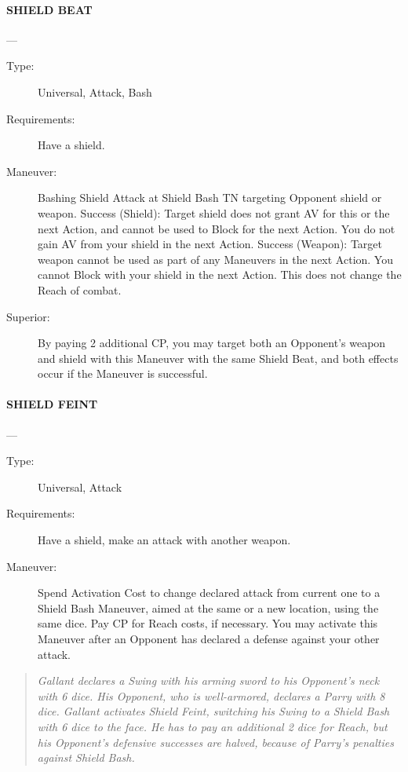 \documentclass[oneside,11pt,english]{book}
\begin{document}
\paragraph{\large\label{man:SHIELD BEAT} SHIELD BEAT}---\quad{\large[X+2]}
\vspace{-10pt}\begin{description} 
\item [Type:] Universal, Attack, Bash 
\item [Requirements:] Have a shield. 
\item [Maneuver:] Bashing Shield Attack at Shield Bash TN targeting Opponent shield or weapon. 
Success (Shield): Target shield does not grant AV for this or the next Action, and cannot be used to Block 
for the next Action. You do not gain AV from your shield in the next Action. 
Success (Weapon): Target weapon cannot be used as part of any Maneuvers in the next Action. You 
cannot Block with your shield in the next Action. This does not change the Reach of combat. 
\item [Superior:] By paying 2 additional CP, you may target both an Opponent’s weapon and shield with this 
Maneuver with the same Shield Beat, and both effects occur if the Maneuver is successful. 
\end{description}
\paragraph{\large\label{man:SHIELD FEINT} SHIELD FEINT}---\quad{\large[1]}
\vspace{-10pt}\begin{description} 
\item [Type:] Universal, Attack 
\item [Requirements:] Have a shield, make an attack with another weapon. 
\item [Maneuver:] Spend Activation Cost to change declared attack from current one to a Shield Bash 
Maneuver, aimed at the same or a new location, using the same dice. Pay CP for Reach costs, if 
necessary. You may activate this Maneuver after an Opponent has declared a defense against your other 
attack. 
\end{description}
\begin{quotation}
\emph{Gallant declares a Swing with his arming sword to his Opponent’s neck with 6 dice. His Opponent, who is well-armored, 
declares a Parry with 8 dice. Gallant activates Shield Feint, switching his Swing to a Shield Bash with 6 dice to the face. He has 
to pay an additional 2 dice for Reach, but his Opponent’s defensive successes are halved, because of Parry’s penalties against 
Shield Bash.}
\end{quotation}
\end{document}
